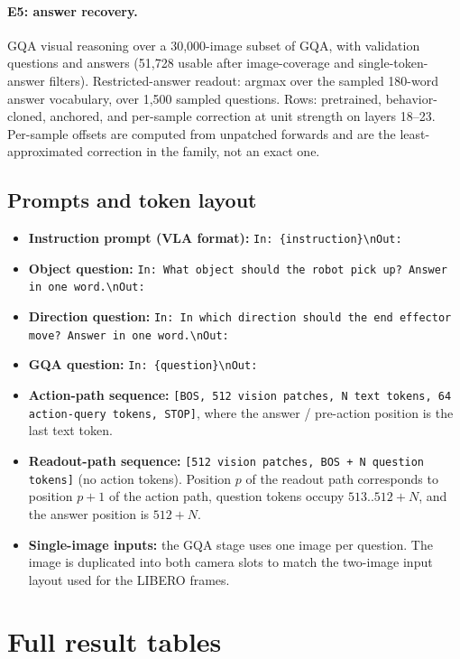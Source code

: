 \documentclass{article}
\begin{document}
\paragraph{E5: answer recovery.} GQA visual reasoning over a 30{,}000-image subset of GQA,
with validation questions and answers (51{,}728 usable after image-coverage and
single-token-answer filters). Restricted-answer readout: argmax over the
sampled 180-word answer vocabulary, over 1{,}500 sampled questions. Rows: pretrained,
behavior-cloned, anchored, and per-sample correction at unit strength on layers 18--23.
Per-sample offsets are computed from unpatched forwards and are the least-approximated
correction in the family, not an exact one.

\subsection{Prompts and token layout}
\label{app:prompts}

\begin{itemize}\raggedright
	\item \textbf{Instruction prompt (VLA format):} \texttt{In: \{instruction\}\textbackslash nOut:}
	\item \textbf{Object question:} \texttt{In: What object should the robot pick up? Answer in one word.\textbackslash nOut:}
	\item \textbf{Direction question:} \texttt{In: In which direction should the end effector move? Answer in one word.\textbackslash nOut:}
	\item \textbf{GQA question:} \texttt{In: \{question\}\textbackslash nOut:}
	\item \textbf{Action-path sequence:} \texttt{[BOS, 512 vision patches, N text tokens, 64 action-query tokens, STOP]}, where the answer / pre-action position is the last text token.
	\item \textbf{Readout-path sequence:} \texttt{[512 vision patches, BOS + N question tokens]} (no action tokens). Position $p$ of the readout path corresponds to position $p{+}1$ of the action path, question tokens occupy $513..512{+}N$, and the answer position is $512{+}N$.
	\item \textbf{Single-image inputs:} the GQA stage uses one image per question. The image is duplicated into both camera slots to match the two-image input layout used for the LIBERO frames.
\end{itemize}

\section{Full result tables}
\label{app:tables}
\end{document}
